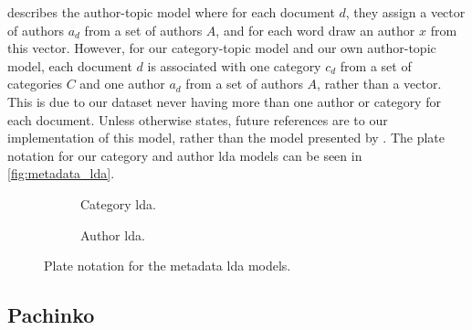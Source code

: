 \citet{author_topic_2012} describes the author-topic model where for each document $d$, they assign a vector of authors $a_d$ from a set of authors $A$, and for each word draw an author $x$ from this vector.
However, for our category-topic model and our own author-topic model, each document $d$ is associated with one category $c_d$ from a set of categories $C$ and one author $a_d$ from a set of authors $A$, rather than a vector.
This is due to our dataset never having more than one author or category for each document.
Unless otherwise states, future references are to our implementation of this model, rather than the model presented by \citet{author_topic_2012}.
The plate notation for our category and author \gls{lda} models can be seen in \autoref{fig:metadata_lda}.

\begin{figure*}[ht]
	\centering
	\begin{subfigure}{0.3\textwidth}
		\centering
		
		\caption{Category \gls{lda}.}
		\label{fig:category_lda}
	\end{subfigure}
	\hspace{5em}
	\begin{subfigure}{0.3\textwidth}
		\centering
		
		\caption{Author \gls{lda}.}
		\label{fig:author_lda}
	\end{subfigure}
	\caption{Plate notation for the metadata \gls{lda} models.}
	\label{fig:metadata_lda}
\end{figure*}

\subsection{Pachinko}


